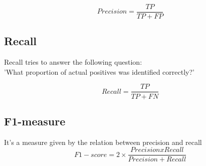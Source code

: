 \documentclass{article}
\begin{document}
\begin{equation}
      Precision = \frac{TP}{TP + FP}
\end{equation}
\subsection{Recall}
Recall tries to answer the following question:\\
'What proportion of actual positives was identified correctly?'

\begin{equation}
      Recall = \frac{TP}{TP + FN}
\end{equation}

\subsection{F1-measure}
It's a measure given by the relation between precision and recall
\begin{equation}
    F1-score = 2 \times \frac{Precision x Recall}{Precision + Recall}
\end{equation}
\end{document}
